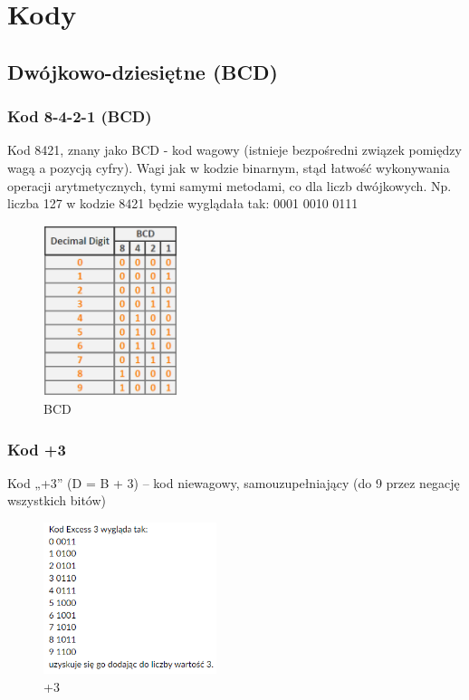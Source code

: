   \section{Kody}

\subsection{Dwójkowo-dziesiętne (BCD)}

\subsubsection{Kod 8-4-2-1 (BCD)}

Kod 8421, znany jako BCD - kod wagowy (istnieje bezpośredni związek pomiędzy wagą a pozycją cyfry).
Wagi jak w kodzie binarnym, stąd łatwość wykonywania operacji arytmetycznych, tymi
samymi metodami, co dla liczb dwójkowych. Np. liczba 127 w kodzie 8421 będzie wyglądała tak: 0001 0010 0111 

\begin{figure}[h!]
    \centering
    \includegraphics[width=0.35\textwidth]{images/codes/bcd.png}
    \caption{BCD}
    \label{fig:my_label}
\end{figure}

\subsubsection{Kod +3}

Kod „+3” (D = B + 3) – kod niewagowy, samouzupełniający (do 9 przez negację wszystkich bitów)

\begin{figure}[h!]
    \centering
    \includegraphics[width=0.45\textwidth]{images/codes/plus_three.png}
    \caption{+3}
    \label{fig:my_label}
\end{figure}

